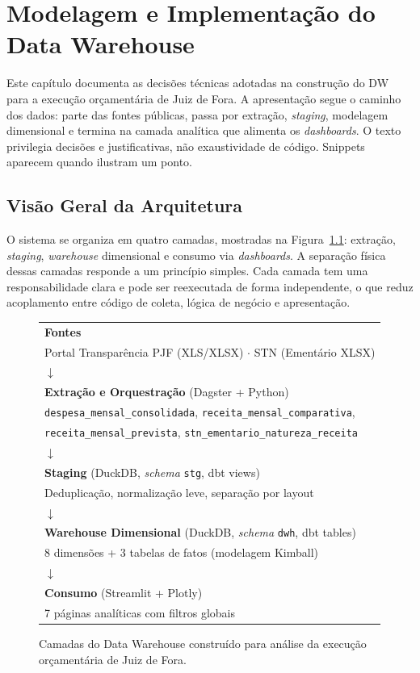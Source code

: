 \chapter{Modelagem e Implementação do Data Warehouse}
\label{cap:dw}

Este capítulo documenta as decisões técnicas adotadas na construção do DW para a execução orçamentária de Juiz de Fora. A apresentação segue o caminho dos dados: parte das fontes públicas, passa por extração, \textit{staging}, modelagem dimensional e termina na camada analítica que alimenta os \textit{dashboards}. O texto privilegia decisões e justificativas, não exaustividade de código. Snippets aparecem quando ilustram um ponto.

\section{Visão Geral da Arquitetura}

O sistema se organiza em quatro camadas, mostradas na Figura~\ref{fig:arquitetura-dw}: extração, \textit{staging}, \textit{warehouse} dimensional e consumo via \textit{dashboards}. A separação física dessas camadas responde a um princípio simples. Cada camada tem uma responsabilidade clara e pode ser reexecutada de forma independente, o que reduz acoplamento entre código de coleta, lógica de negócio e apresentação.

\begin{figure}[ht]
\begin{center}
\begin{tabular}{|l|}
\hline
\textbf{Fontes} \\
Portal Transparência PJF (XLS/XLSX) $\cdot$ STN (Ementário XLSX) \\
\hline
$\downarrow$ \\
\hline
\textbf{Extração e Orquestração} (Dagster + Python) \\
\texttt{despesa\_mensal\_consolidada}, \texttt{receita\_mensal\_comparativa}, \\
\texttt{receita\_mensal\_prevista}, \texttt{stn\_ementario\_natureza\_receita} \\
\hline
$\downarrow$ \\
\hline
\textbf{Staging} (DuckDB, \textit{schema} \texttt{stg}, dbt views) \\
Deduplicação, normalização leve, separação por layout \\
\hline
$\downarrow$ \\
\hline
\textbf{Warehouse Dimensional} (DuckDB, \textit{schema} \texttt{dwh}, dbt tables) \\
8 dimensões + 3 tabelas de fatos (modelagem Kimball) \\
\hline
$\downarrow$ \\
\hline
\textbf{Consumo} (Streamlit + Plotly) \\
7 páginas analíticas com filtros globais \\
\hline
\end{tabular}
\caption{Camadas do Data Warehouse construído para análise da execução orçamentária de Juiz de Fora.}
\label{fig:arquitetura-dw}
\end{center}
\end{figure}

